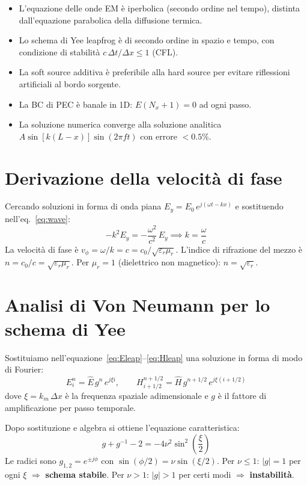 \documentclass[a4paper, 11pt]{article}
\newcommand{\eps}{\varepsilon}
\newcommand{\muu}{\mu}
\newcommand{\dx}{\Delta x}
\newcommand{\dt}{\Delta t}
\begin{document}
\begin{itemize}
    \item L'equazione delle onde EM è iperbolica (secondo ordine nel tempo),
          distinta dall'equazione parabolica della diffusione termica.
    \item Lo schema di Yee leapfrog è di secondo ordine in spazio e tempo,
          con condizione di stabilità $c\,\dt/\dx \le 1$ (CFL).
    \item La soft source additiva è preferibile alla hard source per evitare
          riflessioni artificiali al bordo sorgente.
    \item La BC di PEC è banale in 1D: $E(N_x+1) = 0$ ad ogni passo.
    \item La soluzione numerica converge alla soluzione analitica
          $A\sin[k(L-x)]\sin(2\pi f t)$ con errore $< 0.5\%$.
\end{itemize}

\appendix

\section{Derivazione della velocità di fase}

Cercando soluzioni in forma di onda piana $E_y = E_0\,e^{j(\omega t - kx)}$
e sostituendo nell'eq.~\eqref{eq:wave}:
\[
    -k^2 E_y = -\frac{\omega^2}{c^2}\,E_y
    \implies k = \frac{\omega}{c}
\]
La velocità di fase è $v_\phi = \omega/k = c = c_0/\sqrt{\eps_r\muu_r}$.
L'indice di rifrazione del mezzo è $n = c_0/c = \sqrt{\eps_r\muu_r}$.
Per $\muu_r = 1$ (dielettrico non magnetico): $n = \sqrt{\eps_r}$.

\section{Analisi di Von Neumann per lo schema di Yee}
\label{app:vn}

Sostituiamo nell'equazione~\eqref{eq:Eleap}--\eqref{eq:Hleap}
una soluzione in forma di modo di Fourier:
\[
    E_i^n = \hat{E}\,g^n\,e^{j\xi i}, \qquad
    H_{i+1/2}^{n+1/2} = \hat{H}\,g^{n+1/2}\,e^{j\xi(i+1/2)}
\]
dove $\xi = k_m\,\dx$ è la frequenza spaziale adimensionale e $g$ è il
fattore di amplificazione per passo temporale.

Dopo sostituzione e algebra si ottiene l'equazione caratteristica:
\[
    g + g^{-1} - 2 = -4\nu^2\sin^2\!\left(\frac{\xi}{2}\right)
\]
Le radici sono $g_{1,2} = e^{\pm j\phi}$ con
$\sin(\phi/2) = \nu\sin(\xi/2)$.
Per $\nu \le 1$: $|g| = 1$ per ogni $\xi$ $\Rightarrow$ \textbf{schema stabile}.
Per $\nu > 1$: $|g| > 1$ per certi modi $\Rightarrow$ \textbf{instabilità}.
\end{document}
